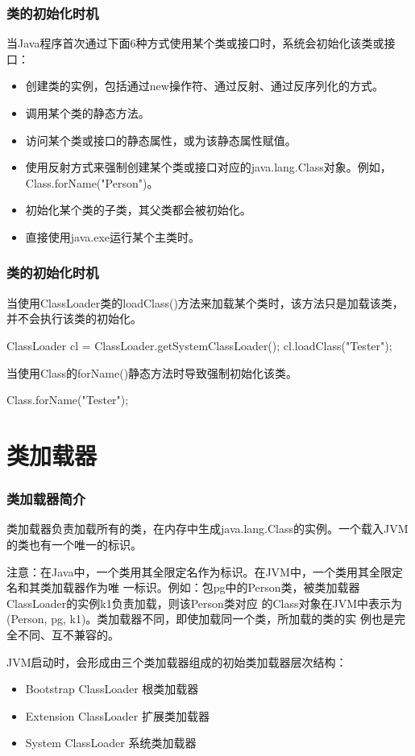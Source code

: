 \begin{frame}[fragile] %
\frametitle{类的初始化时机}

当Java程序首次通过下面6种方式使用某个类或接口时，系统会初始化该类或接口：
\begin{itemize}\kai
\item 创建类的实例，包括通过new操作符、通过反射、通过反序列化的方式。
\item 调用某个类的静态方法。
\item 访问某个类或接口的静态属性，或为该静态属性赋值。
\item 使用反射方式来强制创建某个类或接口对应的java.lang.Class对象。例如，Class.forName("Person")。
\item 初始化某个类的子类，其父类都会被初始化。
\item 直接使用java.exe运行某个主类时。
\end{itemize}


\end{frame}

\begin{frame}[fragile] %
\frametitle{类的初始化时机}

当使用ClassLoader类的loadClass()方法来加载某个类时，该方法只是加载该类，并不会执行该类的初始化。

\begin{javaCode}
ClassLoader cl = ClassLoader.getSystemClassLoader();
cl.loadClass("Tester");  
\end{javaCode}

当使用Class的forName()静态方法时导致强制初始化该类。
\begin{javaCode}
Class.forName("Tester");  
\end{javaCode}
\end{frame}

\section{类加载器}

\begin{frame}[fragile] %
\frametitle{类加载器简介}

类加载器负责加载所有的类，在内存中生成java.lang.Class的实例。一个载入JVM的类也有一个唯一的标识。

注意：在Java中，一个类用其全限定名作为标识。在JVM中，一个类用其全限定名和其类加载器作为唯
一标识。例如：包pg中的Person类，被类加载器ClassLoader的实例k1负责加载，则该Person类对应
的Class对象在JVM中表示为(Person, pg, k1)。类加载器不同，即使加载同一个类，所加载的类的实
例也是完全不同、互不兼容的。

JVM启动时，会形成由三个类加载器组成的初始类加载器层次结构：
\begin{itemize}\kai
\item Bootstrap ClassLoader  根类加载器
\item Extension ClassLoader  扩展类加载器
\item System ClassLoader  系统类加载器
\end{itemize}
\end{frame}

